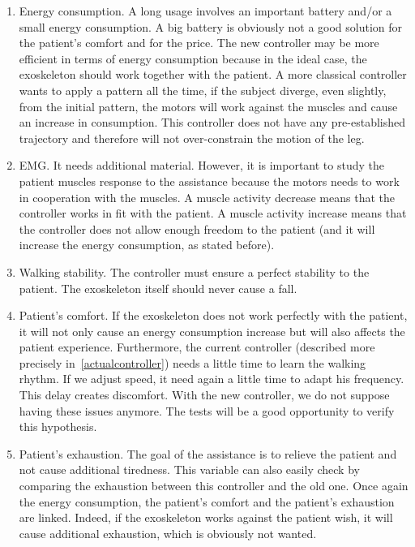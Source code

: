 \documentclass[a4paper,12pt]{article}
\begin{document}
\begin{enumerate}
	\item Energy consumption. A long usage involves an important battery and/or a small energy consumption. A big battery is obviously not a good solution for the patient's comfort and for the price. The new controller may be more efficient in terms of energy consumption because in the ideal case, the exoskeleton should work together with the patient. A more classical controller wants to apply a pattern all the time, if the subject diverge, even slightly, from the initial pattern, the motors will work against the muscles and cause an increase in consumption. %
    This controller does not have any pre-established trajectory and therefore will not over-constrain the motion of the leg. 
    \item EMG. It needs additional material. However, it is important to study the patient muscles response to the assistance because the motors needs to work in cooperation with the muscles. A muscle activity decrease means that the controller works in fit with the patient. A muscle activity increase means that the controller does not allow enough freedom to the patient (and it will increase the energy consumption, as stated before).
    \item Walking stability. The controller must ensure a perfect stability to the patient. The exoskeleton itself should never cause a fall.
    \item Patient's comfort. If the exoskeleton does not work perfectly with the patient, it will not only cause an energy consumption increase but will also affects the patient experience. Furthermore, the current controller (described more precisely in~\ref{actualcontroller}) needs a little time to learn the walking rhythm. If we adjust speed, it need again a little time to adapt his frequency. This delay creates discomfort. With the new controller, we do not suppose having these issues anymore. The tests will be a good opportunity to verify this hypothesis.
    \item Patient's exhaustion. The goal of the assistance is to relieve the patient and not cause additional tiredness. This variable can also easily check by comparing the exhaustion between this controller and the old one. Once again the energy consumption, the patient's comfort and the patient's exhaustion are linked. Indeed, if the exoskeleton works against the patient wish, it will cause additional exhaustion, which is obviously not wanted.
\end{enumerate}
\end{document}

